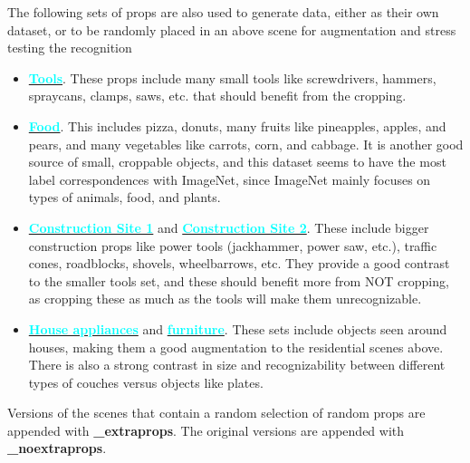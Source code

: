 The following sets of props are also used to generate data, either as their own dataset, or to be randomly placed in an above scene for augmentation and stress testing the recognition
\begin{itemize}[noitemsep,leftmargin=*]
    \item \textbf{\href{https://www.unrealengine.com/marketplace/en-US/product/toolshed-garage-props-vol-1-hand-tools-clamps-etc}{\textcolor{cyan}{Tools}}}. These props include many small tools like screwdrivers, hammers, spraycans, clamps, saws, etc. that should benefit from the cropping.
    \item \textbf{\href{https://www.unrealengine.com/marketplace/en-US/product/food-pack}{\textcolor{cyan}{Food}}}. This includes pizza, donuts, many fruits like pineapples, apples, and pears, and many vegetables like carrots, corn, and cabbage. It is another good source of small, croppable objects, and this dataset seems to have the most label correspondences with ImageNet, since ImageNet mainly focuses on types of animals, food, and plants.
    \item \textbf{\href{https://www.unrealengine.com/marketplace/en-US/product/construction-site-vol-1-supply-and-material-props}{\textcolor{cyan}{Construction Site 1}}} and \textbf{\href{https://www.unrealengine.com/marketplace/en-US/product/construction-site-vol-2-tools-parts-and-machine-props}{\textcolor{cyan}{Construction Site 2}}}. These include bigger construction props like power tools (jackhammer, power saw, etc.), traffic cones, roadblocks, shovels, wheelbarrows, etc. They provide a good contrast to the smaller tools set, and these should benefit more from NOT cropping, as cropping these as much as the tools will make them unrecognizable.
    \item \textbf{\href{https://www.unrealengine.com/marketplace/en-US/product/hq-residential-house}{\textcolor{cyan}{House appliances}}} and \textbf{\href{https://www.unrealengine.com/marketplace/en-US/product/a4907129f69c44a892f76782489736ab}{\textcolor{cyan}{furniture}}}. These sets include objects seen around houses, making them a good augmentation to the residential scenes above. There is also a strong contrast in size and recognizability between different types of couches versus objects like plates.
\end{itemize}

Versions of the scenes that contain a random selection of random props are appended with \textbf{\_extraprops}. The original versions are appended with \textbf{\_noextraprops}.

